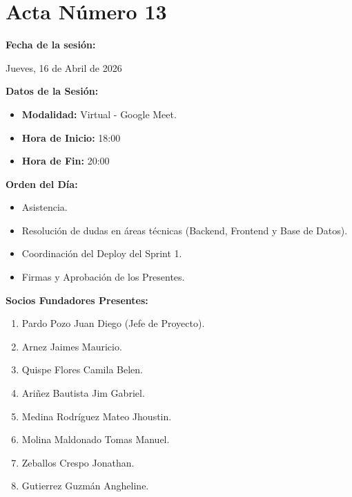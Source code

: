 \newpage
\section{Acta Número 13}
\label{sec:acta13}

\noindent \textbf{Fecha de la sesión:}\par
Jueves, 16 de Abril de 2026

\vspace*{0.5cm}
\noindent \textbf{Datos de la Sesión:}
\vspace{-0.2cm}
\begin{itemize}[noitemsep]
    \item \textbf{Modalidad:} Virtual - Google Meet.
    \item \textbf{Hora de Inicio:} 18:00
    \item \textbf{Hora de Fin:} 20:00
\end{itemize}

\vspace*{0.5cm}
\noindent \textbf{Orden del Día:}
\vspace{-0.2cm}
\begin{itemize}[noitemsep]
    \item Asistencia.
    \item Resolución de dudas en áreas técnicas (Backend, Frontend y Base de Datos).
    \item Coordinación del Deploy del Sprint 1.
    \item Firmas y Aprobación de los Presentes.
\end{itemize}

\vspace*{0.5cm}
\noindent \textbf{Socios Fundadores Presentes:}
\vspace{-0.2cm}
\begin{enumerate}[noitemsep]
    \item Pardo Pozo Juan Diego (Jefe de Proyecto).
    \item Arnez Jaimes Mauricio.
    \item Quispe Flores Camila Belen.
    \item Ariñez Bautista Jim Gabriel.
    \item Medina Rodríguez Mateo Jhoustin.
    \item Molina Maldonado Tomas Manuel.
    \item Zeballos Crespo Jonathan.
    \item Gutierrez Guzmán Angheline.
\end{enumerate}

